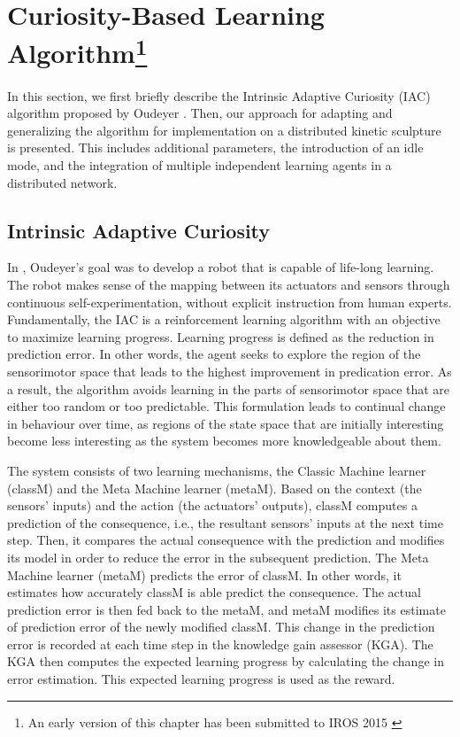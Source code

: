 \chapter[Curiosity-Based Learning Algorithm]
{Curiosity-Based Learning Algorithm\footnote{An early version of this chapter has been submitted to IROS 2015 \cite{Chan2015} }} 
\label{chap:cbla}
 
In this section, we first briefly describe the Intrinsic Adaptive Curiosity (IAC) algorithm proposed by Oudeyer \cite{Oudeyer2007}. Then, our approach for adapting and generalizing the algorithm for implementation on a distributed kinetic sculpture is presented. This includes additional parameters, the introduction of an idle mode, and the integration of multiple independent learning agents in a distributed network. 

\section{Intrinsic Adaptive Curiosity}

In \cite{Oudeyer2007}, Oudeyer's goal was to develop a robot that is capable of life-long learning. The robot makes sense of the mapping between its actuators and sensors through continuous self-experimentation, without explicit instruction from human experts. Fundamentally, the IAC is a reinforcement learning algorithm with an objective to maximize learning progress. Learning progress is defined as the reduction in prediction error. In other words, the agent seeks to explore the region of the sensorimotor space that leads to the highest improvement in predication error. As a result, the algorithm avoids learning in the parts of sensorimotor space that are either too random or too predictable. This formulation leads to continual change in behaviour over time, as regions of the state space that are initially interesting become less interesting as the system becomes more knowledgeable about them. 
 
The system consists of two learning mechanisms, the Classic Machine learner (classM) and the Meta Machine learner (metaM).  Based on the context (the sensors' inputs) and the action (the actuators' outputs), classM computes a prediction of the consequence, i.e., the resultant sensors' inputs at the next time step. Then, it compares the actual consequence with the prediction and modifies its model in order to reduce the error in the subsequent prediction. The Meta Machine learner (metaM) predicts the error of classM. In other words, it estimates how accurately classM is able predict the consequence. The actual prediction error is then fed back to the metaM, and metaM modifies its estimate of prediction error of the newly modified classM. This change in the prediction error is recorded at each time step in the knowledge gain assessor (KGA). The KGA then computes the expected learning progress by calculating the change in error estimation.  This expected learning progress is used as the reward. 

